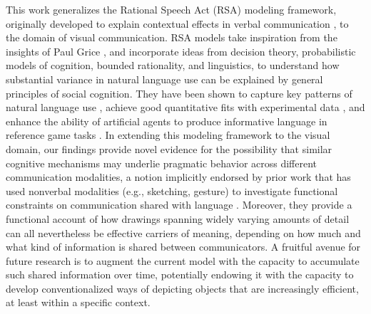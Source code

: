 \documentclass[9pt,twocolumn,twoside]{pnas-new}
\begin{document}
This work generalizes the Rational Speech Act (RSA) modeling framework, originally developed to explain contextual effects in verbal communication \cite{frank2012predicting,goodman2013knowledge,franke2016probabilistic,bergen2016pragmatic}, to the domain of visual communication.
RSA models take inspiration from the insights of Paul Grice \cite{grice1975syntax}, and incorporate ideas from decision theory, probabilistic models of cognition, bounded rationality, and linguistics, to understand how substantial variance in natural language use can be explained by general principles of social cognition. 
They have been shown to capture key patterns of natural language use \cite{goodman2013knowledge}, achieve good quantitative fits with experimental data \cite{kao2014formalizing}, and enhance the ability of artificial agents to produce informative language in reference game tasks \cite{monroe2017colors,Cohn-GordonGP18}.
In extending this modeling framework to the visual domain, our findings provide novel evidence for the possibility that similar cognitive mechanisms may underlie pragmatic behavior across different communication modalities, a notion implicitly endorsed by prior work that has used nonverbal modalities (e.g., sketching, gesture) to investigate functional constraints on communication shared with language
\cite{goldin1977development,Garrod:2007wk,fay2010interactive,theisen2010systematicity,garrod2010can,Galantucci:2005uh,verhoef2014emergence}. %
Moreover, they provide a functional account of how drawings spanning widely varying amounts of detail can all nevertheless be effective carriers of meaning, depending on how much and what kind of information is shared between communicators. 
A fruitful avenue for future research is to augment the current model with the capacity to accumulate such shared information over time, potentially endowing it with the capacity to develop conventionalized ways of depicting objects that are increasingly efficient, at least within a specific context. 


\end{document}
